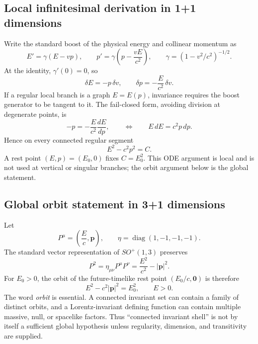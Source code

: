 \documentclass[11pt,a4paper]{article}
\begin{document}
\subsection{Local infinitesimal derivation in 1+1 dimensions}
Write the standard boost of the physical energy and collinear momentum as
\begin{equation}
E'=\gamma(E-vp),\qquad
p'=\gamma\left(p-\frac{vE}{c^2}\right),
\qquad
\gamma=(1-v^2/c^2)^{-1/2}.
\label{eq:massshellboost}
\end{equation}
At the identity, $\gamma'(0)=0$, so
\begin{equation}
\delta E=-p\,\delta v,
\qquad
\delta p=-\frac{E}{c^2}\,\delta v.
\label{eq:massshellgenerator}
\end{equation}
If a regular local branch is a graph $E=E(p)$, invariance requires the boost generator to be tangent to it.  The fail-closed form, avoiding division at degenerate points, is
\begin{equation}
-p=-\frac{E}{c^2}\frac{dE}{dp},
\qquad\Longleftrightarrow\qquad
E\,dE=c^2p\,dp.
\label{eq:massshelltangent}
\end{equation}
Hence on every connected regular segment
\begin{equation}
E^2-c^2p^2=C.
\label{eq:massshelllocal}
\end{equation}
A rest point $(E,p)=(E_0,0)$ fixes $C=E_0^2$.  This ODE argument is local and is not used at vertical or singular branches; the orbit argument below is the global statement.

\subsection{Global orbit statement in 3+1 dimensions}
Let
\begin{equation}
P^\mu=\left(\frac{E}{c},\mathbf p\right),
\qquad
\eta=\operatorname{diag}(1,-1,-1,-1).
\end{equation}
The standard vector representation of $SO^+(1,3)$ preserves
\begin{equation}
P^2=\eta_{\mu\nu}P^\mu P^\nu
=\frac{E^2}{c^2}-|\mathbf p|^2.
\label{eq:fourmomentumnorm}
\end{equation}
For $E_0>0$, the orbit of the future-timelike rest point $(E_0/c,\mathbf0)$ is therefore
\begin{equation}
\boxed{E^2-c^2|\mathbf p|^2=E_0^2,\qquad E>0.}
\label{eq:commonmassshell}
\end{equation}
The word \emph{orbit} is essential.  A connected invariant set can contain a family of distinct orbits, and a Lorentz-invariant defining function can contain multiple massive, null, or spacelike factors.  Thus ``connected invariant shell'' is not by itself a sufficient global hypothesis unless regularity, dimension, and transitivity are supplied.
\end{document}
